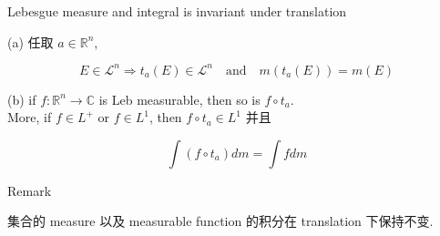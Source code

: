 \documentclass{qlnotes-export}
\begin{document}
\begin{theorem}{Lebesgue measure and integral is invariant under translation}\label{thm-07-lebesgue-measure-on-r-n-lebesgue-measure-and-integral-is-invariant-under-translation}

(a) 任取 \(a \in {\mathbb{R}}^{n}\),

\[E \in \mathcal{L}^{n}\Longrightarrow t_{a}(E) \in \mathcal{L}^{n}\quad\text{and}\quad m(t_{a}(E)) = m(E)\]

(b) if \(f:{\mathbb{R}}^{n}\rightarrow{\mathbb{C}}\) is Leb measurable, then so is \(f \circ t_{a}\).\\
More, if \(f \in L^{+}\) or \(f \in L^{1}\), then \(f \circ t_{a} \in L^{1}\) 并且

\[\int(f \circ t_{a}) dm = \int f dm\]

\end{theorem}

\begin{qlremark}{Remark}

集合的 measure 以及 measurable function 的积分在 translation 下保持不变.

\end{qlremark}
\end{document}
